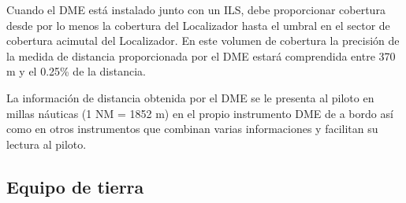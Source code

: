 Cuando el DME est\'a instalado junto con un ILS, debe proporcionar cobertura desde por lo menos la cobertura del Localizador hasta el umbral en el sector de cobertura acimutal del Localizador. En este volumen de cobertura la precisi\'on de la medida de distancia proporcionada por el DME estar\'a comprendida entre 370 m y el 0.25\% de la distancia.

La informaci\'on de distancia obtenida por el DME se le presenta al piloto en millas n\'auticas (1 NM = 1852 m) en el propio instrumento DME de a bordo as\'i como en otros instrumentos que combinan varias informaciones y facilitan su lectura al piloto.

\subsection{Equipo de tierra}
\label{sec:DME.equipo.tierra}

